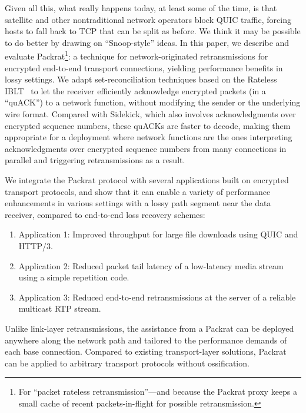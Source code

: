 Given all this, what really happens today, at least some
of the time, is that satellite and other nontraditional network
operators block QUIC traffic, forcing hosts to fall back to TCP that
can be split as before. We think it may be possible to do better by drawing on ``Snoop-style''
ideas. In this paper, we describe and evaluate Packrat\footnote{For
``packet rateless retransmission''---and because the Packrat proxy keeps
a small cache of recent packets-in-flight for possible
retransmission.}: a technique for network-originated retransmissions
for encrypted end-to-end transport connections, yielding performance
benefits in lossy settings. We adapt set-reconciliation techniques
based on the Rateless IBLT~\cite{yang2024practical} to let the
receiver efficiently acknowledge encrypted packets (in a ``quACK'') to a network
function, without modifying the sender or the underlying wire
format. Compared with Sidekick, which also involves
acknowledgments over encrypted sequence numbers, these quACKs
are faster to decode, making them appropriate for a deployment
where network functions are the ones interpreting acknowledgments over
encrypted sequence numbers from many connections in parallel and
triggering retransmissions as a result.


We integrate the Packrat protocol with several applications built on encrypted
transport protocols, and show that it can enable a variety of performance
enhancements in various settings with a lossy path segment near the data receiver,
compared to end-to-end loss recovery schemes:

\begin{enumerate}[noitemsep]
\item Application 1: Improved throughput for large file downloads using QUIC and HTTP/3.
\item Application 2: Reduced packet tail latency of a low-latency media stream using a simple repetition code.
\item Application 3: Reduced end-to-end retransmissions at the server of a reliable multicast RTP stream.
\end{enumerate}

\noindent Unlike link-layer retransmissions, the assistance from a Packrat can be
deployed anywhere along the network path and tailored to the performance
demands of each base connection. Compared to existing transport-layer
solutions, Packrat can be applied to arbitrary transport protocols without
ossification.

